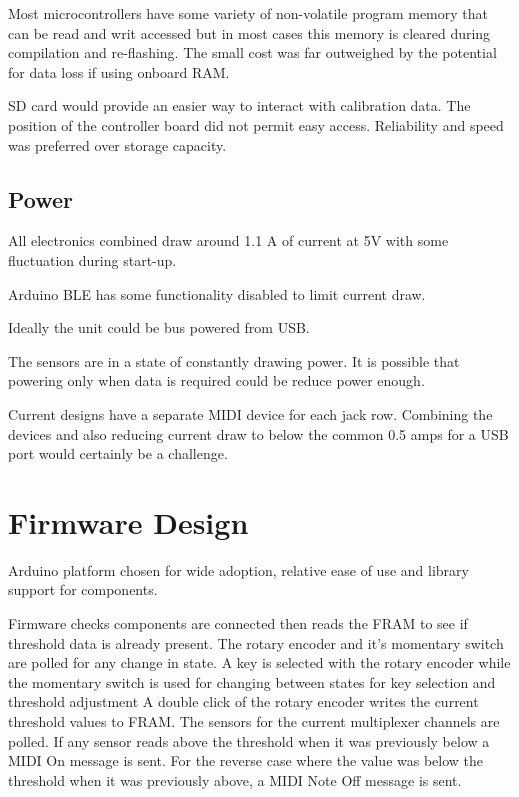 Most microcontrollers have some variety of non-volatile program memory
that can be read and writ accessed but in most cases this memory is
cleared during compilation and re-flashing. The small cost was far
outweighed by the potential for data loss if using onboard RAM.



SD card would provide an easier way to interact with calibration data.
The position of the controller board did not permit easy access.
Reliability and speed was preferred over storage capacity.



\subsection{Power}\label{power}

All electronics combined draw around 1.1 A of current at 5V with some fluctuation during start-up.

Arduino BLE has some functionality disabled to limit current draw.

Ideally the unit could be bus powered from USB.

The sensors are in a state of constantly drawing power. 
It is possible that powering only when data is required could be reduce power enough.

Current designs have a separate MIDI device for each jack row. 
Combining the devices and also reducing current draw to below the common 0.5 amps for a USB port would certainly be a challenge.

\section{Firmware Design}\label{firmware-design}

Arduino platform chosen for wide adoption, relative ease of use and
library support for components.

Firmware checks components are connected then reads the FRAM to see if
threshold data is already present. The rotary encoder and it's momentary
switch are polled for any change in state. A key is selected with the
rotary encoder while the momentary switch is used for changing between
states for key selection and threshold adjustment A double click of the
rotary encoder writes the current threshold values to FRAM. The sensors
for the current multiplexer channels are polled. If any sensor reads
above the threshold when it was previously below a MIDI On message is
sent. For the reverse case where the value was below the threshold when
it was previously above, a MIDI Note Off message is sent.


